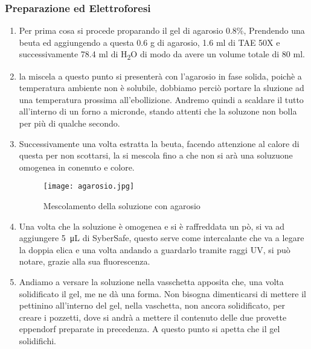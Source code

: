 \documentclass{article}
\begin{document}
\subsubsection{Preparazione ed Elettroforesi}


\begin{enumerate}

\item Per prima cosa si procede proparando il gel di agarosio 0.8\%, Prendendo una beuta ed aggiungendo a questa 0.6 g di agarosio, 1.6 ml di TAE 50X e successivamente 78.4 ml di H\textsubscript{2}O di modo da avere un volume totale di 80 ml. 

\item la miscela a questo punto si presenterà con l'agarosio in fase solida, poichè a temperatura ambiente non è solubile, dobbiamo perciò portare la sluzione ad una temperatura prossima all'ebollizione. Andremo quindi a scaldare il tutto all'interno di un forno a micronde, stando attenti che la soluzone non bolla per più di qualche secondo.

\item Successivamente una volta estratta la beuta, facendo attenzione al calore di questa per non scottarsi, la si mescola fino a che non si arà una soluzuone omogenea in conenuto e colore.

\begin{figure}[H]

\centering
\texttt{[image: agarosio.jpg]}
\caption{Mescolamento della soluzione con agarosio}
\label{agarosio}

\end{figure}

\item Una volta che la soluzione è omogenea e si è raffreddata un pò, si va ad aggiungere \SI{5}{\micro\liter} di SyberSafe, questo serve come intercalante che va a legare la doppia elica e una volta andando a guardarlo tramite raggi UV, si può notare, grazie alla sua fluorescenza. 

\item Andiamo a versare la soluzione nella vasschetta apposita che, una volta solidificato il gel, me ne dà una forma. Non bisogna dimenticarsi di mettere il pettinino all'interno del gel, nella vaschetta, non ancora solidificato, per creare i pozzetti, dove si andrà a mettere il contenuto delle due provette eppendorf preparate in precedenza. A questo punto si apetta che il gel solidifichi.

\begin{figure}[H]


\end{figure}
\end{enumerate}
\end{document}
